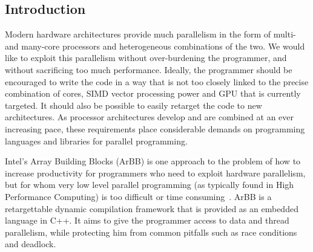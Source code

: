 
\subsection{Introduction} 

Modern hardware architectures provide much parallelism in the form of
multi- and many-core processors and heterogeneous combinations of the two.
We would like to exploit this parallelism without over-burdening the programmer, and without sacrificing too much performance.
Ideally, the programmer should be encouraged to write the code in a way that is not too closely linked to the precise combination of cores, SIMD vector processing power and GPU
that is currently targeted.
It should also be possible to easily retarget the code to new architectures.
As processor architectures develop and are combined at an ever increasing pace, these requirements place considerable demands on programming languages
and libraries for parallel programming.

Intel's Array Building Blocks (ArBB) is one approach to the problem of how to increase productivity for programmers who need to exploit hardware parallelism, but for whom very low level parallel programming (as typically found in High Performance Computing) is too difficult or time consuming~. ArBB is a retargettable dynamic compilation framework that is provided as an embedded language in C++. It aims to give the programmer access to data and thread parallelism, while protecting him from common pitfalls such as race conditions and deadlock.

